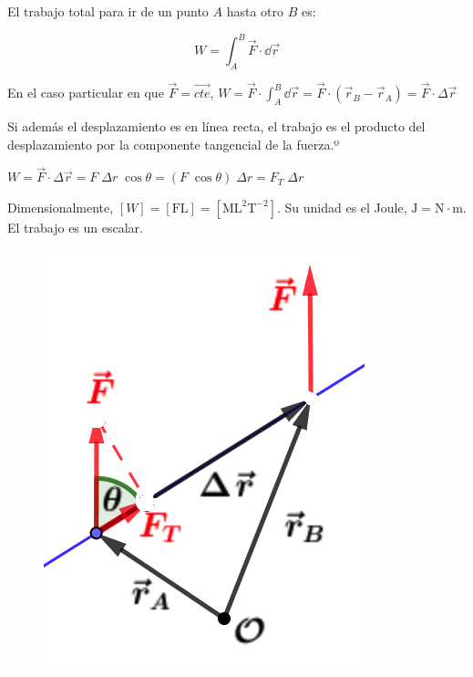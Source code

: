 El trabajo total para ir de un punto $A$ hasta otro $B$ es:

\begin{equation}
\label{trabajo}
W=\int_A^B\vec F \cdot \dd \vec r	
\end{equation}

En el caso particular en que $\vec F=\overrightarrow{cte}$, 
$W=\vec F \cdot \int_A^B \dd \vec r=\vec F\cdot (\vec r_B-\vec r_A)=\vec F \cdot \Delta \vec r$

\begin{multicols}{2}
Si además el desplazamiento es en línea recta, el trabajo es el producto del desplazamiento por la componente tangencial de la fuerza.º

\vspace{3mm} %
$W=\vec F\cdot \Delta \vec r=F\; \Delta r\; 	\cos \theta= (F\; \cos \theta)\; \Delta r= F_T \;\Delta r$

\vspace{3mm} %
Dimensionalmente, $[W]=[\mathrm{FL}]=[\mathrm{ML}^2\mathrm{T}^{-2}]$. Su unidad es el Joule, $\mathrm{J}=\mathrm{N} \cdot \mathrm{m}$. El trabajo es un escalar.
\begin{figure}[H]
		\centering
		\includegraphics[width=.4\textwidth]{imagenes/imagenes03/T03IM03.png}
		\end{figure}	
\end{multicols}





